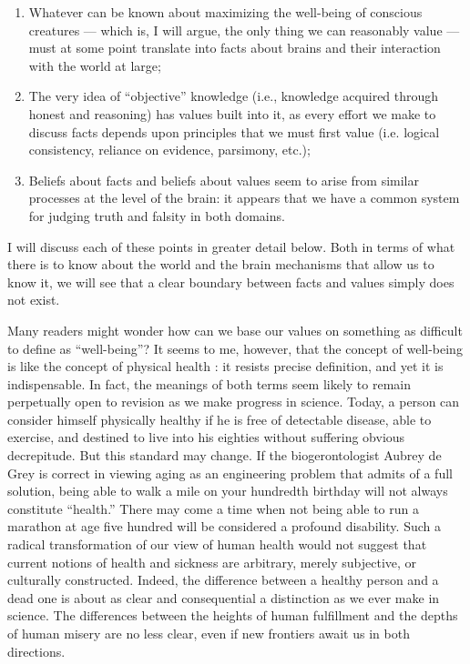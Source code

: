\documentclass[a4paper,14pt]{extbook}
\begin{document}
\begin{enumerate}

      \item
            Whatever can be known about maximizing the well-being of conscious creatures --- which is, I will argue, the only thing we can reasonably value --- must at some point translate into facts about brains and their interaction with the world at large;
      \item
            The very idea of ``objective'' knowledge (i.e., knowledge acquired through honest and reasoning) has values built into it, as every effort we make to discuss facts depends upon principles that we must first value (i.e. logical consistency, reliance on evidence, parsimony, etc.);
      \item
            Beliefs about facts and beliefs about values seem to arise from similar processes at the level of the brain:
            it appears that we have a common system for judging truth and falsity in both domains.

\end{enumerate}


I will discuss each of these points in greater detail below.
Both in terms of what there is to know about the world and the brain mechanisms that allow us to know it, we will see that a clear boundary between facts and values simply does not exist.

Many readers might wonder how can we base our values on something as difficult to define as ``well-being''?
It seems to me, however, that the concept of well-being is like the concept of physical health :
it resists precise definition, and yet it is indispensable.
In fact, the meanings of both terms seem likely to remain perpetually open to revision as we make progress in science.
Today, a person can consider himself physically healthy if he is free of detectable disease, able to exercise, and destined to live into his eighties without suffering obvious decrepitude.
But this standard may change.
If the biogerontologist Aubrey de Grey is correct in viewing aging as an engineering problem that admits of a full solution, being able to walk a mile on your hundredth birthday will not always constitute ``health.''
There may come a time when not being able to run a marathon at age five hundred will be considered a profound disability.
Such a radical transformation of our view of human health would not suggest that current notions of health and sickness are arbitrary, merely subjective, or culturally constructed.
Indeed, the difference between a healthy person and a dead one is about as clear and consequential a distinction as we ever make in science.
The differences between the heights of human fulfillment and the depths of human misery are no less clear, even if new frontiers await us in both directions.
\end{document}

